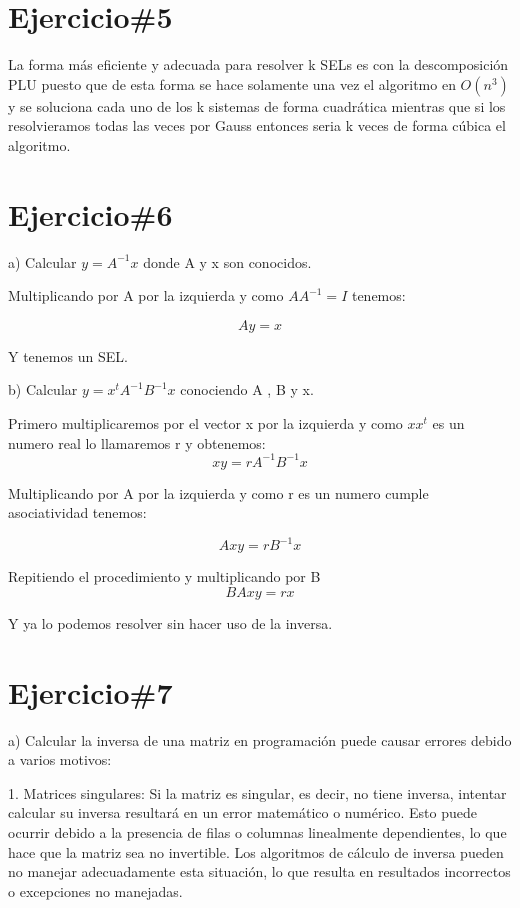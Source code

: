 \documentclass[a4paper,12pt]{article}
\begin{document}
\section*{Ejercicio\#5}

La forma más eficiente y adecuada para resolver k SELs es con la descomposición PLU puesto que de esta forma se hace solamente una vez el algoritmo en $O(n^3)$ y se soluciona cada uno de los k sistemas de forma cuadrática mientras que si los resolvieramos todas las veces por Gauss entonces seria k veces de forma cúbica el algoritmo.

\section*{Ejercicio\#6}

a) Calcular $y = A ^{-1} x$ donde A y x son conocidos.

Multiplicando por A por la izquierda y como $A A ^{-1} = I$ tenemos:

\[A y = x \] 

Y tenemos un SEL.

b) Calcular $y = x^t A^{-1} B^{-1} x$ conociendo A , B y x.

Primero multiplicaremos por el vector x por la izquierda y como $x x^t$ es un numero real lo llamaremos r y obtenemos:
 \[x y = r A^{-1} B^{-1} x\]

Multiplicando por A por la izquierda y como r es un numero cumple asociatividad tenemos:

\[A x y = r B^{-1} x\]

Repitiendo el procedimiento y multiplicando por B 
\[B A x y = r x\]

Y ya lo podemos resolver sin hacer uso de la inversa.

\section*{Ejercicio\#7}

a)
Calcular la inversa de una matriz en programación puede causar errores debido a varios motivos:

1. Matrices singulares: Si la matriz es singular, es decir, no tiene inversa, intentar calcular su inversa resultará en un error matemático o numérico. Esto puede ocurrir debido a la presencia de filas o columnas linealmente dependientes, lo que hace que la matriz sea no invertible. Los algoritmos de cálculo de inversa pueden no manejar adecuadamente esta situación, lo que resulta en resultados incorrectos o excepciones no manejadas.
\end{document}

